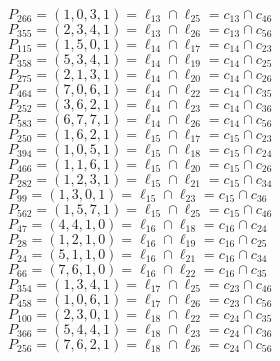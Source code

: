 \documentclass{article}
\begin{document}
{\begin{multicols}{2}
$P_{266} = ( 1, 0, 3, 1 ) = \ell_{13} \cap \ell_{25}  = c_{13} \cap c_{46}$\\
$P_{355} = ( 2, 3, 4, 1 ) = \ell_{13} \cap \ell_{26}  = c_{13} \cap c_{56}$\\
$P_{115} = ( 1, 5, 0, 1 ) = \ell_{14} \cap \ell_{17}  = c_{14} \cap c_{23}$\\
$P_{358} = ( 5, 3, 4, 1 ) = \ell_{14} \cap \ell_{19}  = c_{14} \cap c_{25}$\\
$P_{275} = ( 2, 1, 3, 1 ) = \ell_{14} \cap \ell_{20}  = c_{14} \cap c_{26}$\\
$P_{464} = ( 7, 0, 6, 1 ) = \ell_{14} \cap \ell_{22}  = c_{14} \cap c_{35}$\\
$P_{252} = ( 3, 6, 2, 1 ) = \ell_{14} \cap \ell_{23}  = c_{14} \cap c_{36}$\\
$P_{583} = ( 6, 7, 7, 1 ) = \ell_{14} \cap \ell_{26}  = c_{14} \cap c_{56}$\\
$P_{250} = ( 1, 6, 2, 1 ) = \ell_{15} \cap \ell_{17}  = c_{15} \cap c_{23}$\\
$P_{394} = ( 1, 0, 5, 1 ) = \ell_{15} \cap \ell_{18}  = c_{15} \cap c_{24}$\\
$P_{466} = ( 1, 1, 6, 1 ) = \ell_{15} \cap \ell_{20}  = c_{15} \cap c_{26}$\\
$P_{282} = ( 1, 2, 3, 1 ) = \ell_{15} \cap \ell_{21}  = c_{15} \cap c_{34}$\\
$P_{99} = ( 1, 3, 0, 1 ) = \ell_{15} \cap \ell_{23}  = c_{15} \cap c_{36}$\\
$P_{562} = ( 1, 5, 7, 1 ) = \ell_{15} \cap \ell_{25}  = c_{15} \cap c_{46}$\\
$P_{47} = ( 4, 4, 1, 0 ) = \ell_{16} \cap \ell_{18}  = c_{16} \cap c_{24}$\\
$P_{28} = ( 1, 2, 1, 0 ) = \ell_{16} \cap \ell_{19}  = c_{16} \cap c_{25}$\\
$P_{24} = ( 5, 1, 1, 0 ) = \ell_{16} \cap \ell_{21}  = c_{16} \cap c_{34}$\\
$P_{66} = ( 7, 6, 1, 0 ) = \ell_{16} \cap \ell_{22}  = c_{16} \cap c_{35}$\\
$P_{354} = ( 1, 3, 4, 1 ) = \ell_{17} \cap \ell_{25}  = c_{23} \cap c_{46}$\\
$P_{458} = ( 1, 0, 6, 1 ) = \ell_{17} \cap \ell_{26}  = c_{23} \cap c_{56}$\\
$P_{100} = ( 2, 3, 0, 1 ) = \ell_{18} \cap \ell_{22}  = c_{24} \cap c_{35}$\\
$P_{366} = ( 5, 4, 4, 1 ) = \ell_{18} \cap \ell_{23}  = c_{24} \cap c_{36}$\\
$P_{256} = ( 7, 6, 2, 1 ) = \ell_{18} \cap \ell_{26}  = c_{24} \cap c_{56}$\\

\end{multicols}}
\end{document}
